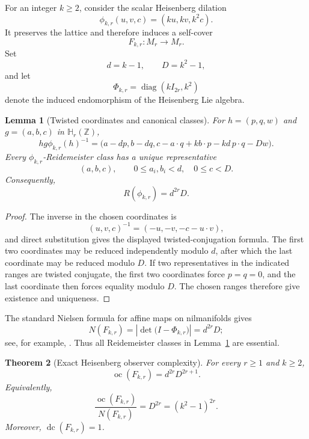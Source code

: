\documentclass[11pt]{article}
\newtheorem{theorem}{Theorem}[section]
\newtheorem{lemma}[theorem]{Lemma}
\DeclareMathOperator{\oc}{oc}
\DeclareMathOperator{\dc}{dc}
\newcommand{\Z}{\mathbb Z}
\newcommand{\Heis}{\mathbb H}
\begin{document}
For an integer $k\ge2$, consider the scalar Heisenberg dilation
\[
  \phi_{k,r}(u,v,c)=(ku,kv,k^2c).
\]
It preserves the lattice and therefore induces a self-cover
\[
  F_{k,r}\colon M_r\longrightarrow M_r.
\]
Set
\[
  d=k-1,
  \qquad
  D=k^2-1,
\]
and let
\[
  \Phi_{k,r}=\operatorname{diag}(kI_{2r},k^2)
\]
denote the induced endomorphism of the Heisenberg Lie algebra.

\begin{lemma}[Twisted coordinates and canonical classes]
\label{lem:heisclasses}
For $h=(p,q,w)$ and $g=(a,b,c)$ in $\Heis_r(\Z)$,
\[
 h g\phi_{k,r}(h)^{-1}
 =\bigl(a-dp,b-dq,
 c-a\!\cdot q+k b\!\cdot p-kd\,p\!\cdot q-Dw\bigr).
\]
Every $\phi_{k,r}$-Reidemeister class has a unique representative
\[
  (a,b,c),
  \qquad
  0\le a_i,b_i<d,
  \quad
  0\le c<D.
\]
Consequently,
\[
  R(\phi_{k,r})=d^{2r}D.
\]
\end{lemma}

\begin{proof}
The inverse in the chosen coordinates is
\[
  (u,v,c)^{-1}=(-u,-v,-c-u\!\cdot v),
\]
and direct substitution gives the displayed twisted-conjugation formula.
The first two coordinates may be reduced independently modulo $d$, after
which the last coordinate may be reduced modulo $D$.  If two representatives
in the indicated ranges are twisted conjugate, the first two coordinates
force $p=q=0$, and the last coordinate then forces equality modulo $D$.
The chosen ranges therefore give existence and uniqueness.
\end{proof}

The standard Nielsen formula for affine maps on nilmanifolds gives
\[
  N(F_{k,r})
  =\left|\det\bigl(I-\Phi_{k,r}\bigr)\right|
  =d^{2r}D;
\]
see, for example, \cite{DeconinckDekimpe}.  Thus all Reidemeister classes in
Lemma~\ref{lem:heisclasses} are essential.

\begin{theorem}[Exact Heisenberg observer complexity]
\label{thm:heisexact}
For every $r\ge1$ and $k\ge2$,
\[
  \boxed{\oc(F_{k,r})=d^{2r}D^{2r+1}.}
\]
Equivalently,
\[
  \frac{\oc(F_{k,r})}{N(F_{k,r})}=D^{2r}=(k^2-1)^{2r}.
\]
Moreover, $\dc(F_{k,r})=1$.
\end{theorem}
\end{document}
